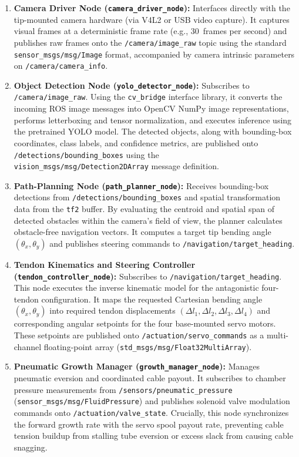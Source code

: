 \begin{enumerate}
    \item \textbf{Camera Driver Node (\texttt{camera\_driver\_node}):} Interfaces directly with the tip-mounted camera hardware (via V4L2 or USB video capture). It captures visual frames at a deterministic frame rate (e.g., 30~frames per second) and publishes raw frames onto the \texttt{/camera/image\_raw} topic using the standard \texttt{sensor\_msgs/msg/Image} format, accompanied by camera intrinsic parameters on \texttt{/camera/camera\_info}.
    
    \item \textbf{Object Detection Node (\texttt{yolo\_detector\_node}):} Subscribes to \texttt{/camera/image\_raw}. Using the \texttt{cv\_bridge} interface library, it converts the incoming ROS image messages into OpenCV NumPy image representations, performs letterboxing and tensor normalization, and executes inference using the pretrained YOLO model. The detected objects, along with bounding-box coordinates, class labels, and confidence metrics, are published onto \texttt{/detections/bounding\_boxes} using the \texttt{vision\_msgs/msg/Detection2DArray} message definition.
    
    \item \textbf{Path-Planning Node (\texttt{path\_planner\_node}):} Receives bounding-box detections from \texttt{/detections/bounding\_boxes} and spatial transformation data from the \texttt{tf2} buffer. By evaluating the centroid and spatial span of detected obstacles within the camera's field of view, the planner calculates obstacle-free navigation vectors. It computes a target tip bending angle $(\theta_x, \theta_y)$ and publishes steering commands to \texttt{/navigation/target\_heading}.
    
    \item \textbf{Tendon Kinematics and Steering Controller (\texttt{tendon\_controller\_node}):} Subscribes to \texttt{/navigation/target\_heading}. This node executes the inverse kinematic model for the antagonistic four-tendon configuration. It maps the requested Cartesian bending angle $(\theta_x, \theta_y)$ into required tendon displacements $(\Delta l_1, \Delta l_2, \Delta l_3, \Delta l_4)$ and corresponding angular setpoints for the four base-mounted servo motors. These setpoints are published onto \texttt{/actuation/servo\_commands} as a multi-channel floating-point array (\texttt{std\_msgs/msg/Float32MultiArray}).
    
    \item \textbf{Pneumatic Growth Manager (\texttt{growth\_manager\_node}):} Manages pneumatic eversion and coordinated cable payout. It subscribes to chamber pressure measurements from \texttt{/sensors/pneumatic\_pressure} (\texttt{sensor\_msgs/msg/FluidPressure}) and publishes solenoid valve modulation commands onto \texttt{/actuation/valve\_state}. Crucially, this node synchronizes the forward growth rate with the servo spool payout rate, preventing cable tension buildup from stalling tube eversion or excess slack from causing cable snagging.
    

\end{enumerate}
